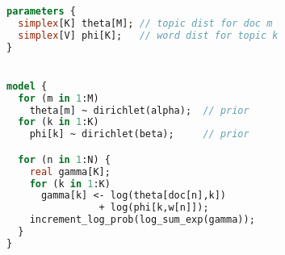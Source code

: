 \documentclass[sigplan,10pt,screen]{acmart}
\begin{document}
\begin{figure*}
\begin{minipage}[t]{0.49\textwidth}
\begin{lstlisting}[language=Stan]
parameters {
  simplex[K] theta[M]; // topic dist for doc m
  simplex[V] phi[K];   // word dist for topic k
}


model {
  for (m in 1:M)
    theta[m] ~ dirichlet(alpha);  // prior
  for (k in 1:K)
    phi[k] ~ dirichlet(beta);     // prior

  for (n in 1:N) {
    real gamma[K];
    for (k in 1:K)
      gamma[k] <- log(theta[doc[n],k])
                + log(phi[k,w[n]]);
    increment_log_prob(log_sum_exp(gamma));
  }
}
\end{lstlisting}
\end{minipage}
\end{figure*}
\end{document}
